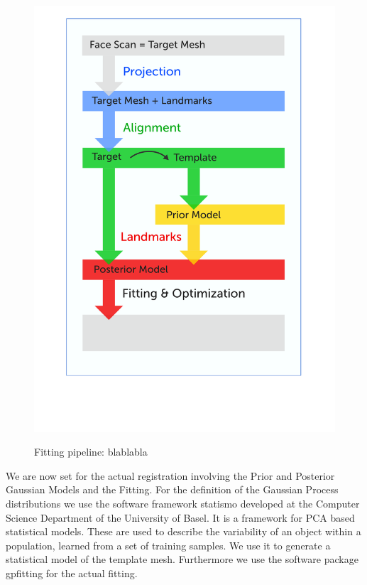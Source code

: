 \begin{figure}[h!]
\centering
\includegraphics[width=\textwidth]{./resources/figures/pipeline.pdf}
\label{fig:pipeline}
\vspace{-90pt}
\caption{Fitting pipeline: blablabla}
\end{figure}

We are now set for the actual registration involving the Prior and Posterior Gaussian Models and the Fitting. For the definition of the Gaussian Process distributions we use the software framework statismo developed at the Computer Science Department of the University of Basel. It is a framework for PCA based statistical models. These are used to describe the variability of an object within a population, learned from a set of training samples. We use it to generate a
statistical model of the template mesh. Furthermore we use the software package gpfitting for the actual fitting. 

